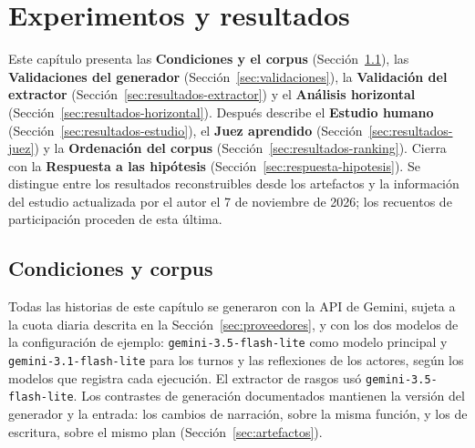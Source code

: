 \chapter{Experimentos y resultados}\label{chapter:experiments}

Este capítulo presenta las \textbf{Condiciones y el corpus} (Sección~\ref{sec:corpus}), las
\textbf{Validaciones del generador} (Sección~\ref{sec:validaciones}), la \textbf{Validación del
extractor} (Sección~\ref{sec:resultados-extractor}) y el \textbf{Análisis horizontal}
(Sección~\ref{sec:resultados-horizontal}). Después describe el \textbf{Estudio humano}
(Sección~\ref{sec:resultados-estudio}), el \textbf{Juez aprendido}
(Sección~\ref{sec:resultados-juez}) y la \textbf{Ordenación del corpus}
(Sección~\ref{sec:resultados-ranking}). Cierra con la \textbf{Respuesta a las hipótesis}
(Sección~\ref{sec:respuesta-hipotesis}). Se distingue entre los resultados reconstruibles desde los
artefactos y la información del estudio actualizada por el autor el 7 de noviembre de 2026; los
recuentos de participación proceden de esta última.

\section{Condiciones y corpus}\label{sec:corpus}

Todas las historias de este capítulo se generaron con la API de Gemini, sujeta a la cuota diaria
descrita en la Sección~\ref{sec:proveedores}, y con los dos modelos de la configuración de ejemplo:
\texttt{gemini-3.5-flash-lite} como modelo principal y \texttt{gemini-3.1-flash-lite} para los turnos
y las reflexiones de los actores, según los modelos que registra cada ejecución. El extractor de
rasgos usó \texttt{gemini-3.5-flash-lite}. Los contrastes de generación documentados mantienen la versión del
generador y la entrada: los cambios de narración, sobre la misma función, y los de
escritura, sobre el mismo plan (Sección~\ref{sec:artefactos}).

